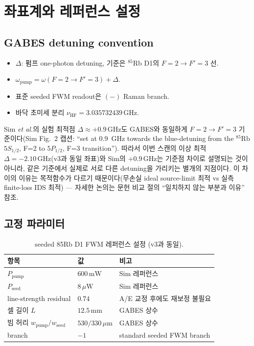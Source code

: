 \documentclass[11pt,a4paper]{article}
\newcommand{\GHz}{\,\mathrm{GHz}}
\begin{document}
\section{좌표계와 레퍼런스 설정}

\subsection{GABES detuning convention}
\begin{itemize}[nosep]
\item $\Delta$: 펌프 one-photon detuning, 기준은 $^{85}$Rb D1의 $F=2\to F'=3$ 선.
\item $\omega_{\mathrm{pump}}=\omega(F=2\to F'=3)+\Delta$.
\item 표준 seeded FWM readout은 $(-)$ Raman branch.
\item 바닥 초미세 분리 $\nu_{\mathrm{HF}}=3.035732439\GHz$.
\end{itemize}

Sim \textit{et al.}의 실험 최적점 $\Delta\approx+0.9\GHz$도 GABES와 동일하게
$F=2\to F'=3$ 기준이다(Sim Fig.~2 캡션: ``set at 0.9~GHz towards the
blue-detuning from the $^{85}$Rb $5S_{1/2}$, F=2 to $5P_{1/2}$, F=3
transition''). 따라서 이번 스캔의 이상 최적 $\Delta=-2.10\GHz$(v3과 동일 좌표)와
Sim의 $+0.9\GHz$는 기준점 차이로 설명되는 것이 아니라, 같은 기준에서 실제로
서로 다른 detuning을 가리키는 별개의 지점이다. 이 차이의 이유는 목적함수가
다르기 때문이다(무손실 ideal source-limit 최적 vs 실측 finite-loss IDS
최적) — 자세한 논의는 문헌 비교 절의 ``일치하지 않는 부분과 이유'' 참조.

\subsection{고정 파라미터}
\begin{table}[h]
\centering
\caption{seeded 85Rb D1 FWM 레퍼런스 설정 (v3과 동일).}
\label{tab:refparams}
\begin{tabular}{lll}
\toprule
항목 & 값 & 비고\\
\midrule
$P_{\mathrm{pump}}$ & $600\,\mathrm{mW}$ & Sim 레퍼런스\\
$P_{\mathrm{seed}}$ & $8\,\mu\mathrm{W}$ & Sim 레퍼런스\\
line-strength residual & $0.74$ & A/E 교정 후에도 재보정 불필요\\
셀 길이 $L$ & $12.5\,\mathrm{mm}$ & GABES 상수\\
빔 허리 $w_{\mathrm{pump}}/w_{\mathrm{seed}}$ & $530/330\,\mu\mathrm{m}$ & GABES 상수\\
branch & $-1$ & standard seeded FWM branch\\
\bottomrule
\end{tabular}
\end{table}
\end{document}
